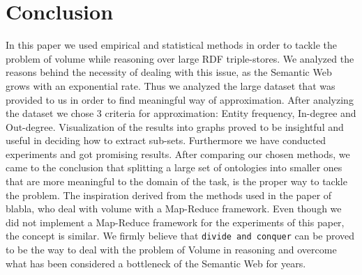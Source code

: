 \documentclass[runningheads,a4paper]{../../StyleFiles/llncs}
\begin{document}
\section{Conclusion}
In this paper we used empirical and statistical methods in order to tackle the problem of volume while reasoning over large RDF triple-stores. We analyzed the reasons behind the necessity of dealing with this issue, as the Semantic Web grows with an exponential rate. Thus we analyzed the large dataset that was provided to us in order to find meaningful way of approximation. After analyzing the dataset we chose 3 criteria for approximation: Entity frequency, In-degree and Out-degree. Visualization of the results into graphs proved to be insightful and useful in deciding how to extract sub-sets. 
Furthermore we have conducted experiments and got promising results. After comparing our chosen methods, we came to the conclusion that splitting a large set of ontologies into smaller ones that are more meaningful to the domain of the task, is the proper way to tackle the problem. The inspiration derived from the methods used in the paper of blabla, who deal with volume with a Map-Reduce framework. Even though we did not implement a Map-Reduce framework for the experiments of this paper, the concept is similar. 
We firmly believe that \texttt{divide and conquer}  can be proved to be the way to deal with the problem of Volume in reasoning and overcome what has been considered a bottleneck of the Semantic Web for years.



\end{document}
